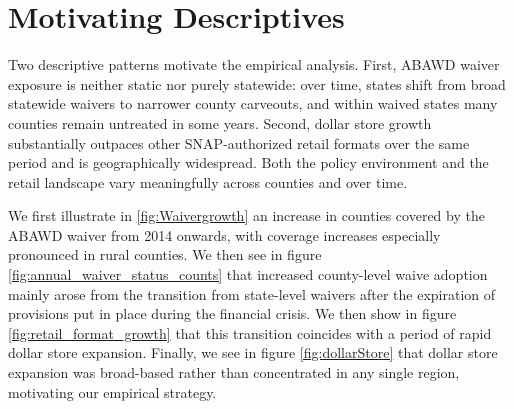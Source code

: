 \documentclass[12pt]{article}
\begin{document}

\section{Motivating Descriptives}

Two descriptive patterns motivate the empirical analysis. First, ABAWD waiver exposure is neither static nor purely statewide: over time, states shift from broad statewide waivers to narrower county carveouts, and within waived states many counties remain untreated in some years. Second, dollar store growth substantially outpaces other SNAP-authorized retail formats over the same period and is geographically widespread. Both the policy environment and the retail landscape vary meaningfully across counties and over time.

We first illustrate in \ref{fig:Waivergrowth} an increase in counties covered by the ABAWD waiver from 2014 onwards, with coverage increases especially pronounced in rural counties. We then see in figure \ref{fig:annual_waiver_status_counts} that increased county-level waive adoption mainly arose from the transition from state-level waivers after the expiration of provisions put in place during the financial crisis. We then show in figure \ref{fig:retail_format_growth} that this transition coincides with a period of rapid dollar store expansion. Finally, we see in figure \ref{fig:dollarStore} that dollar store expansion was broad-based rather than concentrated in any single region, motivating our empirical strategy.
\end{document}

